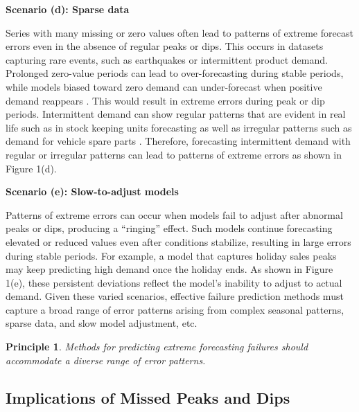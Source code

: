 \documentclass[preprint,12pt]{elsarticle}
\newtheorem{principle}{Principle}
\newenvironment{scenario}[1]{%
  \par\vspace{1ex}\noindent\textbf{#1}\par\vspace{0.5ex}}{\par}
\begin{document}
\begin{scenario}{Scenario (d): Sparse data}

Series with many missing or zero values often lead to patterns of extreme forecast errors even in the absence of regular peaks or dips. This occurs in datasets capturing rare events, such as earthquakes or intermittent product demand. Prolonged zero-value periods can lead to over-forecasting during stable periods, while models biased toward zero demand can under-forecast when positive demand reappears \citep{wang2024b}. This would result in extreme errors during peak or dip periods. Intermittent demand can show regular patterns that are evident in real life such as in stock keeping units forecasting \citep{nikolopoulos2021, nikolopoulos2016} as well as irregular patterns \citep{kaya2020} such as demand for vehicle spare parts \citep{jiang2021}. Therefore, forecasting intermittent demand with regular or irregular patterns can lead to patterns of extreme errors as shown in Figure 1(d).
\end{scenario}

\begin{scenario}{Scenario (e): Slow-to-adjust models}

Patterns of extreme errors can occur when models fail to adjust after abnormal peaks or dips, producing a “ringing” effect. Such models continue forecasting elevated or reduced values even after conditions stabilize, resulting in large errors during stable periods. For example, a model that captures holiday sales peaks may keep predicting high demand once the holiday ends. As shown in Figure 1(e), these persistent deviations reflect the model’s inability to adjust to actual demand. Given these varied scenarios, effective failure prediction methods must capture a broad range of error patterns arising from complex seasonal patterns, sparse data, and slow model adjustment, etc.
\end{scenario}

\begin{principle}
\textit{Methods for predicting extreme forecasting failures should accommodate a diverse range of error patterns.}
\end{principle}


\subsection{Implications of Missed Peaks and Dips}
\end{document}
